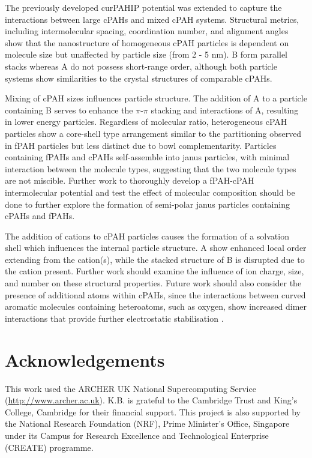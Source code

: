 The previously developed curPAHIP potential was extended to capture the interactions between large cPAHs and mixed cPAH systems. Structural metrics, including intermolecular spacing, coordination number, and alignment angles show that the nanostructure of homogeneous cPAH particles is dependent on molecule size but unaffected by particle size (from 2 - 5 nm). B form parallel stacks whereas A do not possess short-range order, although both particle systems show similarities to the crystal structures of comparable cPAHs.

Mixing of cPAH sizes influences particle structure. The addition of A to a particle containing B serves to enhance the $\pi$-$\pi$ stacking and interactions of A, resulting in lower energy particles. %
Regardless of molecular ratio, heterogeneous cPAH particles show a core-shell type arrangement similar to the partitioning observed in fPAH particles but less distinct due to bowl complementarity. Particles containing fPAHs and cPAHs self-assemble into janus particles, with minimal interaction between the molecule types, suggesting that the two molecule types are not miscible. Further work to thoroughly develop a fPAH-cPAH intermolecular potential and test the effect of molecular composition should be done to further explore the formation of semi-polar janus particles containing cPAHs and fPAHs.

The addition of cations to cPAH particles causes the formation of a solvation shell which influences the internal particle structure. A show enhanced local order extending from the cation(s), while the stacked structure of B is disrupted due to the cation present. Further work should examine the influence of ion charge, size, and number on these structural properties. Future work should also consider the presence of additional atoms within cPAHs, since the interactions between curved aromatic molecules containing heteroatoms, such as oxygen, show increased dimer interactions that provide further electrostatic stabilisation \cite{Cabaleiro-Lago2018}.  


\section*{Acknowledgements}
This work used the ARCHER UK National Supercomputing Service (\url{http://www.archer.ac.uk}).
K.B. is grateful to the Cambridge Trust and King's College, Cambridge for their financial support.
This project is also supported by the National Research Foundation (NRF), Prime Minister's Office, Singapore under its Campus for Research Excellence and Technological Enterprise (CREATE) programme.

